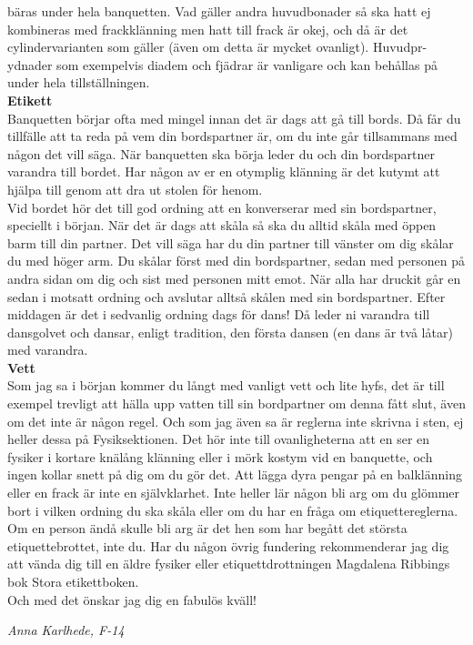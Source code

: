 \documentclass[a6paper,12pt]{article}
\begin{document}
bäras under hela banquetten. Vad gäller andra huvudbonader så ska hatt 
ej kombineras med frackklänning men hatt till frack är okej, och då 
är det cylindervarianten som gäller (även om detta är mycket ovanligt). 
Huvudpr-\\
ydnader som exempelvis diadem och fjädrar är vanligare och kan 
behållas på under hela tillställningen.\\
\normalsize\textbf{Etikett}\\
\footnotesize Banquetten börjar ofta med mingel innan det är dags att gå 
till bords. Då får du tillfälle att ta reda på vem din bordspartner är, 
om du inte går tillsammans med någon det vill säga. När banquetten 
ska börja leder du och din bordspartner varandra till bordet. Har någon 
av er en otymplig klänning är det kutymt att hjälpa till genom att dra 
ut stolen för henom.\\
Vid bordet hör det till god ordning att en konverserar med sin bordspartner, 
speciellt i början. När det är dags att skåla så ska du alltid skåla med 
öppen barm
\newpage
\setlength{\oddsidemargin}{-0.57in}
\noindent
till din partner. Det vill säga har du din partner till vänster om dig 
skålar du med höger arm. Du skålar först med din bordspartner, sedan med 
personen på andra sidan om dig och sist med personen mitt emot. När alla 
har druckit går en sedan i motsatt ordning och avslutar alltså skålen 
med sin bordspartner. Efter middagen är det i sedvanlig ordning dags 
för dans! Då leder ni varandra till dansgolvet och dansar, enligt tradition, 
den första dansen (en dans är två låtar) med varandra.\\
\normalsize\textbf{Vett}\\
\footnotesize Som jag sa i början kommer du långt med vanligt vett och 
lite hyfs, det är till exempel trevligt att hälla upp vatten till sin 
bordpartner om denna fått slut, även om det inte är någon regel. Och som 
jag även sa är reglerna inte skrivna i sten, ej heller dessa på 
Fysiksektionen. Det hör inte till ovanligheterna att en ser en fysiker i 
kortare knälång klänning eller i mörk kostym vid en banquette, och ingen 
kollar snett på dig om du gör det. Att lägga dyra pengar på en balklänning 
eller en frack är inte en självklarhet. Inte heller lär någon bli arg om du 
glömmer bort i vilken ordning du ska skåla eller om du har en fråga om 
etiquettereglerna. Om en person ändå skulle bli arg är det hen som har begått 
det största etiquettebrottet, inte du. Har du någon övrig fundering 
rekommenderar jag dig att vända dig till en äldre fysiker eller 
etiquettdrottningen Magdalena Ribbings bok Stora etikettboken.\\
\indent Och med det önskar jag dig en fabulös kväll!
\begin{flushright}
\textit{Anna Karlhede, F-14}
\end{flushright}
\end{document}
